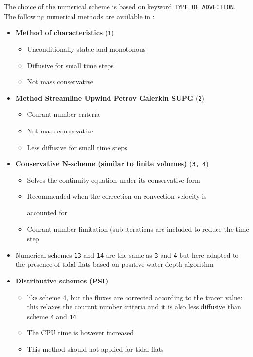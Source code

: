 The choice of the numerical scheme is based on keyword \texttt{TYPE OF
ADVECTION}. The following numerical methods are available in \sisyphe:
\begin{itemize}
\item \textbf{Method of characteristics} (\texttt{1}) 
\begin{itemize}
\item Unconditionally stable and monotonous
\item Diffusive for small time steps
\item Not mass conservative
\end{itemize}
\item \textbf{Method Streamline Upwind Petrov Galerkin SUPG} (\texttt{2}) 
\begin{itemize}
\item Courant number criteria
\item Not mass conservative
\item Less diffusive for small time steps
\end{itemize}
\item \textbf{Conservative N-scheme (similar to finite volumes)} (\texttt{3, 4})
\begin{itemize}
\item Solves the continuity equation under its conservative form
\item Recommended when the correction on convection velocity is

accounted for
\item Courant number limitation (sub-iterations are included to
reduce the time step
\end{itemize}
\item Numerical schemes \texttt{13} and \texttt{14} are the same as \texttt{3} and \texttt{4} 
but here adapted to the presence of tidal flats based on positive water depth algorithm 
\item \textbf{Distributive schemes (PSI)} 
\begin{itemize}
\item like scheme 4, but the fluxes are corrected according to the tracer value: this
relaxes the courant number criteria and it is also less diffusive than
scheme \texttt{4} and \texttt{14}
\item The CPU time is however increased 
\item This method should not applied for tidal flats
\end{itemize}
\end{itemize}


